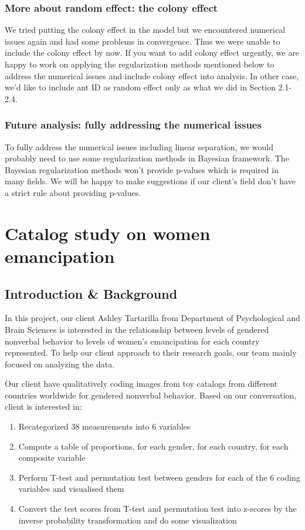 \documentclass{article}
\begin{document}
	\subsubsection{More about random effect: the colony effect}
	We tried putting the colony effect in the model but we encountered numerical issues again and had some problems in convergence. Thus we were unable to include the colony effect by now. If you want to add colony effect urgently, we are happy to work on applying the regularization methods mentioned below to address the numerical issues and include colony effect into analysis. In other case, we’d like to include ant ID as random effect only as what we did in Section 2.1-2.4.
	
	\subsubsection{Future analysis: fully addressing the numerical issues}
	To fully address the numerical issues including linear separation, we would probably need to use some regularization methods in Bayesian framework. The Bayesian regularization methods won’t provide p-values which is required in many fields. We will be happy to make suggestions if our client's field don’t have a strict rule about providing p-values.
	
	\section{Catalog study on women emancipation}
	\subsection{Introduction \& Background}
	In this project, our client Ashley Tartarilla from Department of Psychological and Brain Sciences is interested in the relationship between levels of gendered nonverbal behavior to levels of women's emancipation for each country represented. To help our client approach to their research goals, our team mainly focused on analyzing the data.
	
	Our client have qualitatively coding images from toy catalogs from different countries worldwide for gendered nonverbal behavior. Based on our conversation, client is interested in: 
	\begin{enumerate}
		\item Recategorized 38 measurements into 6 variables
		\item Compute a table of proportions, for each gender, for each country, for each composite variable
		\item Perform T-test and permutation test between genders for each of the 6 coding variables and visualised them
		\item Convert the test scores from T-test and permutation test into z-scores by the inverse probability transformation and do some visualization
	\end{enumerate}
\end{document}
